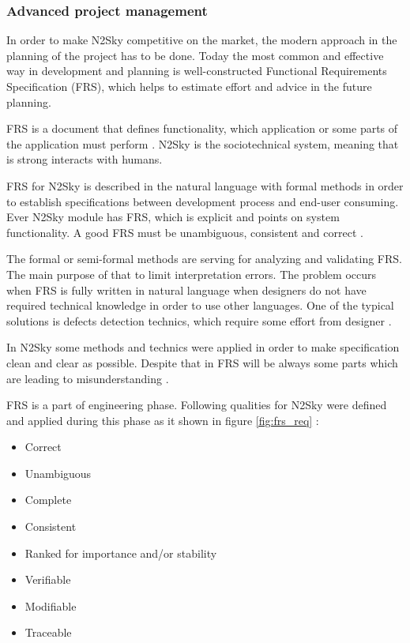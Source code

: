 \subsubsection{Advanced project management}\label{Advanced project management}

In order to make N2Sky competitive on the market, the modern approach in the planning of the project has to be done. Today the most common and effective way in development and planning is well-constructed Functional Requirements Specification (FRS), which helps to estimate effort and advice in the future planning. 

FRS is a document that defines functionality, which application or some parts of the application must perform \cite{wiki:frs}. N2Sky is the sociotechnical system, meaning that is strong interacts with humans. 

FRS for N2Sky is described in the natural language with formal methods in order to establish specifications between development process and end-user consuming. Ever N2Sky module has FRS, which is explicit and points on system functionality. A good FRS must be unambiguous, consistent and correct \cite{frs_1}.  
 
 The formal or semi-formal methods are serving for analyzing and validating FRS. The main purpose of that to limit interpretation errors. The problem occurs when FRS is fully written in natural language when designers do not have required technical knowledge in order to use other languages. One of the typical solutions is defects detection technics, which require some effort from designer \cite{frs_3}. 
 
In N2Sky some methods and technics were applied in order to make specification clean and clear as possible. Despite that in FRS will be always some parts which are leading to misunderstanding \cite{frs_1}.
  
FRS is a part of engineering phase. Following qualities for N2Sky were defined and applied during this phase \cite{frs_4} as it shown in figure \ref{fig:frs_req} :
\begin{itemize}
\item Correct
\item Unambiguous
\item Complete
\item Consistent
\item Ranked for importance and/or stability
\item Verifiable
\item Modifiable
\item Traceable 
\end{itemize}



